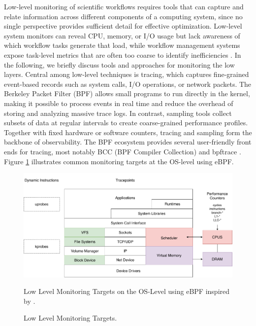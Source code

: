 Low-level monitoring of scientific workflows requires tools that can capture and relate information across different components of a computing system, since no single perspective provides sufficient detail for effective optimization. Low-level system monitors can reveal CPU, memory, or I/O usage but lack awareness of which workflow tasks generate that load, while workflow management systems expose task-level metrics that are often too coarse to identify inefficiencies \cite{Witzke2024}. In the following, we briefly discuss tools and approaches for monitoring the low layers.
Central among low-level techniques is tracing, which captures fine-grained event-based records such as system calls, I/O operations, or network packets. The Berkeley Packet Filter (BPF) allows small programs to run directly in the kernel, making it possible to process events in real time and reduce the overhead of storing and analyzing massive trace logs. In contrast, sampling tools collect subsets of data at regular intervals to create coarse-grained performance profiles. Together with fixed hardware or software counters, tracing and sampling form the backbone of observability.
The BPF ecosystem provides several user-friendly front ends for tracing, most notably BCC (BPF Compiler Collection) and bpftrace \cite{gregg2020bpf}. Figure \ref{fig:02-ebpf-os} illustrates common monitoring targets at the OS-level using eBPF.
\begin{figure}[H]
    \centering
    \includegraphics[scale=0.4]{fig/02/02-ebpf-os.pdf}
    \small
    \caption{Low Level Monitoring Targets.}
    \label{fig:02-ebpf-os}
    \tiny
    Low Level Monitoring Targets on the OS-Level using eBPF inspired by \cite{gregg2020bpf}.
\end{figure}

